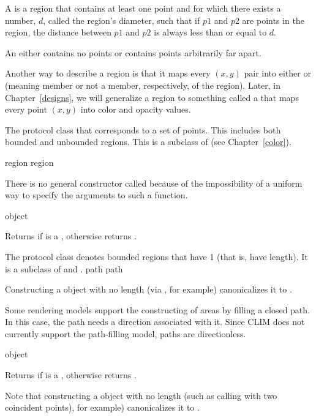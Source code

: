 A  is a region that contains at least one point and for
which there exists a number, $d$, called the region's diameter, such that if
$p1$ and $p2$ are points in the region, the distance between $p1$ and $p2$ is
always less than or equal to $d$.

An  either contains no points or contains points
arbitrarily far apart.

Another way to describe a region is that it maps every $(x,y)$ pair into either
 or  (meaning member or not a member, respectively, of
the region).  Later, in Chapter~\ref{designs}, we will generalize a region to
something called a  that maps every point $(x,y)$ into color and
opacity values.


The protocol class that corresponds to a set of points.  This includes both
bounded and unbounded regions.  This is a subclass of  (see
Chapter~\ref{color}).

 {region} {region}

There is no general constructor called  because of the
impossibility of a uniform way to specify the arguments to such a function.

 {object}

Returns  if  is a , otherwise returns
.


The protocol class  denotes bounded regions that have
 1 (that is, have length).  It is a subclass of
 and .
 {path} {path}

Constructing a  object with no length (via , for
example) canonicalizes it to .

Some rendering models support the constructing of areas by filling a closed
path.  In this case, the path needs a direction associated with it.  Since CLIM
does not currently support the path-filling model, paths are directionless.

 {object}

Returns  if  is a , otherwise returns
.

Note that constructing a  object with no length (such as calling
 with two coincident points), for example) canonicalizes it to
.

